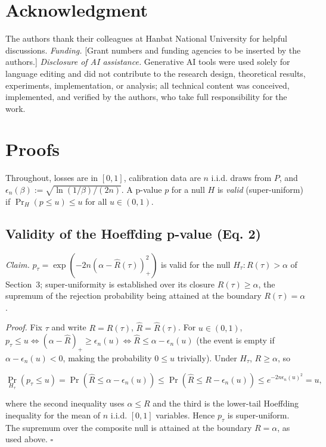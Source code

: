 \documentclass{ieeeaccess}
\begin{document}
\section*{Acknowledgment}

The authors thank their colleagues at Hanbat National University for helpful discussions. \emph{Funding.} [Grant numbers and funding agencies to be inserted by the authors.] \emph{Disclosure of AI assistance.} Generative AI tools were used solely for language editing and did not contribute to the research design, theoretical results, experiments, implementation, or analysis; all technical content was conceived, implemented, and verified by the authors, who take full responsibility for the work.

\onecolumn
\appendices

\section{Proofs}

Throughout, losses are in $[0,1]$, calibration data are $n$ i.i.d. draws from $P$, and $\epsilon_n(\beta):=\sqrt{\ln(1/\beta)/(2n)}$. A p-value $p$ for a null $H$ is \emph{valid} (super-uniform) if $\Pr_H(p\le u)\le u$ for all $u\in(0,1)$.

\subsection{Validity of the Hoeffding p-value (Eq. 2)}

\emph{Claim.} $p_\tau=\exp(-2n(\alpha-\hat R(\tau))_+^2)$ is valid for the null $H_\tau:R(\tau)>\alpha$ of Section~3; super-uniformity is established over its closure $R(\tau)\ge\alpha$, the supremum of the rejection probability being attained at the boundary $R(\tau)=\alpha$.

\emph{Proof.} Fix $\tau$ and write $R=R(\tau)$, $\hat R=\hat R(\tau)$. For $u\in(0,1)$, $p_\tau\le u \iff (\alpha-\hat R)_+\ge\epsilon_n(u) \iff \hat R\le\alpha-\epsilon_n(u)$ (the event is empty if $\alpha-\epsilon_n(u)<0$, making the probability $0\le u$ trivially). Under $H_\tau$, $R\ge\alpha$, so

\[
\Pr_{H_\tau}(p_\tau\le u)=\Pr(\hat R\le\alpha-\epsilon_n(u))\le\Pr(\hat R\le R-\epsilon_n(u))\le e^{-2n\epsilon_n(u)^2}=u,
\]

where the second inequality uses $\alpha\le R$ and the third is the lower-tail Hoeffding inequality for the mean of $n$ i.i.d. $[0,1]$ variables. Hence $p_\tau$ is super-uniform. The supremum over the composite null is attained at the boundary $R=\alpha$, as used above. $\square$
\end{document}
